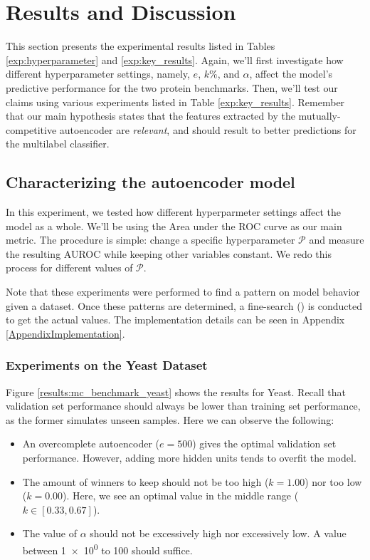 \section{Results and Discussion}
\label{MCResults}

\par This section presents the experimental results listed in Tables
\ref{exp:hyperparameter} and \ref{exp:key_results}. Again, we'll first
investigate how different hyperparameter settings, namely, $e$, $k\%$, and
$\alpha$, affect the model's predictive performance for the two protein
benchmarks. Then, we'll test our claims using various experiments listed in
Table \ref{exp:key_results}. Remember that our main hypothesis states that the
features extracted by the mutually-competitive autoencoder are
\textit{relevant}, and should result to better predictions for the multilabel
classifier.

\subsection{Characterizing the autoencoder model}

In this experiment, we tested how different hyperparmeter settings affect the
model as a whole. We'll be using the Area under the ROC curve as our main
metric. The procedure is simple: change a specific hyperparameter
$\mathcal{P}$ and measure the resulting AUROC while keeping other variables
constant. We redo this process for different values of $\mathcal{P}$. 

\par Note that these experiments were performed to find a pattern on model
behavior given a dataset. Once these patterns are determined, a fine-search
(\cite{bergstra2012random}) is conducted to get the actual values. The
implementation details can be seen in Appendix \ref{AppendixImplementation}.

\subsubsection{Experiments on the Yeast Dataset}

Figure \ref{results:mc_benchmark_yeast} shows the results for Yeast. Recall
that validation set performance should always be lower than training set
performance, as the former simulates unseen samples. Here we can observe the
following:

\begin{itemize}
  \item An overcomplete autoencoder ($e=500$) gives the optimal validation
  set performance. However, adding more hidden units tends to overfit the
  model.
  \item The amount of winners to keep should not be too high ($k=1.00$) nor
  too low ($k=0.00$). Here, we see an optimal value in the middle range
  ($k\in\left[0.33, 0.67\right]$).
  \item The value of $\alpha$ should not be excessively high nor excessively
  low. A value between \num{1e0} to \num{100} should suffice.
\end{itemize}

